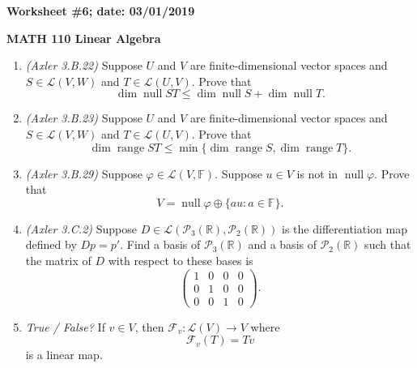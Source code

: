 \documentclass{article}
\newcommand{\RR}{\mathbb{R}}
\DeclareMathOperator*{\opnull}{null}
\DeclareMathOperator*{\range}{range}
\begin{document}
{\bf Worksheet \#6; date: 03/01/2019}

{\bf MATH 110 Linear Algebra}

\begin{enumerate}
\item {\em (Axler 3.B.22)} Suppose $U$ and $V$ are finite-dimensional vector spaces and $S \in \mathcal{L}(V, W)$ and $T \in \mathcal{L}(U, V)$. Prove that
\[
	\dim \opnull ST \le \dim \opnull S + \dim \opnull T.
\]

\item {\em (Axler 3.B.23)} Suppose $U$ and $V$ are finite-dimensional vector spaces and $S \in \mathcal{L}(V, W)$ and $T \in \mathcal{L}(U, V)$. Prove that
\[
	\dim \range ST \le \min\{\dim \range S, \dim \range T\}.
\]

\item {\em (Axler 3.B.29)} Suppose $\varphi \in \mathcal{L}(V, \mathbb{F})$. Suppose $u \in V$ is not in $\opnull \varphi$. Prove that
\[
	V = \opnull \varphi \oplus \{au: a \in \mathbb{F}\}.
\]

\item {\em (Axler 3.C.2)} Suppose $D \in \mathcal{L}(\mathcal{P}_3(\RR), \mathcal{P}_2(\RR))$ is the differentiation map defined by $Dp = p'$. Find a basis of $\mathcal{P}_3(\RR)$ and a basis of $\mathcal{P}_2(\RR)$ such that the matrix of $D$ with respect to these bases is
\[
	\begin{pmatrix}
		1 & 0 & 0 & 0 \\
		0 & 1 & 0 & 0 \\
		0 & 0 & 1 & 0
	\end{pmatrix}.
\]

\item {\em True / False?} If $v \in V$, then $\mathcal{F}_v: \mathcal{L}(V) \to V$ where
\[
	\mathcal{F}_v(T) = Tv
\]
is a linear map.
\end{enumerate}
\end{document}
